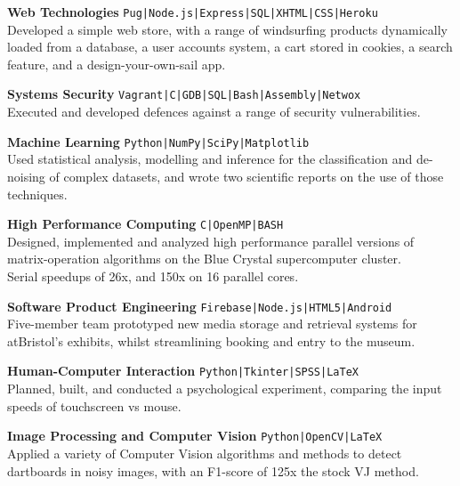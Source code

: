 \documentclass[10pt]{article}
\newcommand{\bold}[1]{\textbf{\textcolor{dark}{#1}}}
\newcommand{\zz}[3]{
{\large\bold{#1}} \hfill 
{\small \colorbox{light}{\texttt{#3}}}\\
{#2}\vspace{0.6em}}
\newcommand{\li}{\textcolor{mid}{|}}
\begin{document}
\begin{minipage}[t]{0.65\textwidth}
\zz{Web Technologies}
{Developed a simple web store, with a range of windsurfing products dynamically loaded from a database, a  user accounts system, a cart stored in cookies, a search feature, and a design-your-own-sail app.}
{Pug\li Node.js\li Express\li SQL\li XHTML\li CSS\li Heroku}




\zz{Systems Security}
{Executed and developed defences against a range of security vulnerabilities.}
{Vagrant\li C\li GDB\li SQL\li Bash\li Assembly\li Netwox}

\zz{Machine Learning}
{Used statistical analysis, modelling and inference for the classification and de-noising of complex datasets, and wrote two scientific reports on the use of those techniques.}
{Python\li NumPy\li SciPy\li Matplotlib}

\zz{High Performance Computing}
{Designed, implemented and analyzed high performance parallel versions of matrix-operation algorithms on the Blue Crystal supercomputer cluster.\\
Serial speedups of 26x, and 150x on 16 parallel cores.}
{C\li OpenMP\li BASH}

\zz{Software Product Engineering}
{Five-member team prototyped new media storage and retrieval systems for atBristol's exhibits, whilst streamlining booking and entry to the museum.}{Firebase\li Node.js\li HTML5\li Android}

\zz{Human-Computer Interaction}
{Planned, built, and conducted a psychological experiment, comparing the input speeds of touchscreen vs mouse.}{Python\li Tkinter\li SPSS\li LaTeX}

\zz{Image Processing and Computer Vision}
{Applied a variety of Computer Vision algorithms and methods to detect dartboards in noisy images, with an F1-score of 125x the stock VJ method.}
{Python\li OpenCV\li LaTeX}



\end{minipage}
\end{document}
